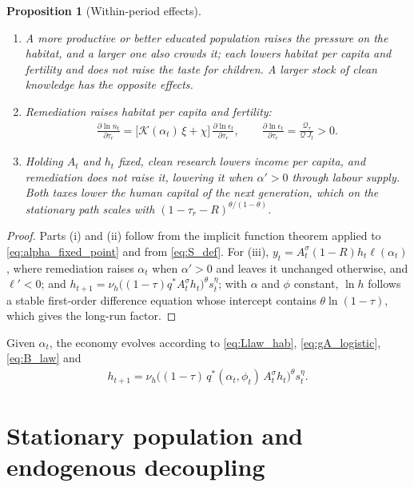 \documentclass[11pt]{article}
\newtheorem{proposition}{Proposition}
\begin{document}
\begin{proposition}[Within-period effects]
\label{prop:tax}
\begin{enumerate}
\item[(i)] A more productive or better educated population raises the pressure on the habitat, and a
larger one also crowds it; each lowers habitat per capita and fertility and does not raise the taste for
children. A larger stock of clean knowledge has the opposite effects.
\item[(ii)] Remediation raises habitat per capita and fertility:
\begin{align}
\frac{\partial\ln n_t}{\partial\tau_r}=\big[\mathcal{K}(\alpha_t)\,\xi+\chi\big]\,
\frac{\partial\ln\epsilon_t}{\partial\tau_r},
\qquad
\frac{\partial\ln\epsilon_t}{\partial\tau_r}=\frac{\mathcal{Q}_\tau}{\mathcal{Q}\,J_t}>0 .
\label{eq:dn_dtau}
\end{align}
\item[(iii)] Holding $A_t$ and $h_t$ fixed, clean research lowers income per capita, and remediation
does not raise it, lowering it when $\alpha'>0$ through labour supply. Both taxes lower the human capital of
the next generation, which on the stationary path scales with $(1-\tau_r-R)^{\theta/(1-\theta)}$.
\end{enumerate}
\end{proposition}

\begin{proof}
Parts (i) and (ii) follow from the implicit function theorem applied to \eqref{eq:alpha_fixed_point}
and from \eqref{eq:S_def}. For (iii), $y_t=A_t^{\sigma}(1-R)h_t\ell(\alpha_t)$, where remediation
raises $\alpha_t$ when $\alpha'>0$ and leaves it unchanged otherwise, and $\ell'<0$; and
$h_{t+1}=\nu_h\big((1-\tau)q^\ast A_t^{\sigma}h_t\big)^{\theta}s_t^{\eta}$; with $\alpha$ and $\phi$ constant,
$\ln h$ follows a stable first-order difference equation whose intercept contains
$\theta\ln(1-\tau)$, which gives the long-run factor.
\end{proof}

Given $\alpha_t$, the economy evolves according to \eqref{eq:Llaw_hab}, \eqref{eq:gA_logistic},
\eqref{eq:B_law} and
\begin{align}
h_{t+1}=\nu_h\big((1-\tau)\,q^\ast(\alpha_t,\phi_t)\,A_t^{\sigma}h_t\big)^{\theta}s_t^{\eta}.
\label{eq:h_tax_dyn}
\end{align}

\section{Stationary population and endogenous decoupling}
\label{sec:theory}
\label{sec:timecost}
\label{sec:endog_env}
\end{document}
